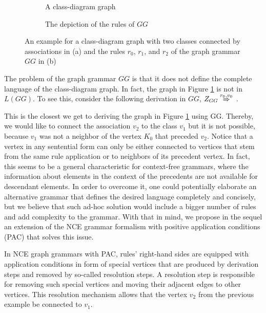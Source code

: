 \documentclass[]{report}
\begin{document}
\begin{figure}[h]
	\begin{subfigure}[t]{0.3\textwidth}
		\centering
		
		\caption{A class-diagram graph}
		\label{fig:classdiagram-g}
	\end{subfigure}
	\begin{subfigure}[t]{0.68\textwidth}
		\centering
		
		\caption{The depiction of the rules of $GG$}
		\label{fig:classdiagram-gg}
	\end{subfigure}
	\caption{An example for a class-diagram graph with two classes connected by associations in (a) and the rules $r_0$, $r_1$, and $r_2$ of the graph grammar $GG$ in (b)}
\end{figure}

The problem of the graph grammar $GG$ is that it does not define the complete language of the class-diagram graph. In fact, the graph in Figure \ref{fig:classdiagram-g} is not in $L(GG)$. To see this, consider the following derivation in $GG$, $\startG{GG} \deriv{r_0}{v_0}{}$
.

This is the closest we get to deriving the graph in Figure \ref{fig:classdiagram-g} using GG. Thereby, we would like to connect the association $v_2$ to the class $v_1$ but it is not possible, because $v_1$ was not a neighbor of the vertex $K_0$ that preceded $v_2$. Notice that a vertex in any sentential form can only be either connected to vertices that stem from the same rule application or to neighbors of its precedent vertex. In fact, this seems to be a general characteristic for context-free grammars, where the information about elements in the context of the precedents are not available for descendant elements. In order to overcome it, one could potentially elaborate an alternative grammar that defines the desired language completely and concisely, but we believe that such ad-hoc solution would include a bigger number of rules and add complexity to the grammar. With that in mind, we propose in the sequel an extension of the NCE grammar formalism with positive application conditions (PAC) that solves this issue. 

In NCE graph grammars with PAC, rules' right-hand sides are equipped with application conditions in form of special vertices that are produced by derivation steps and removed by so-called resolution steps. A resolution step is responsible for removing such special vertices and moving their adjacent edges to other vertices. This resolution mechanism allows that the vertex $v_2$ from the previous example be connected to $v_1$. 
\end{document}

